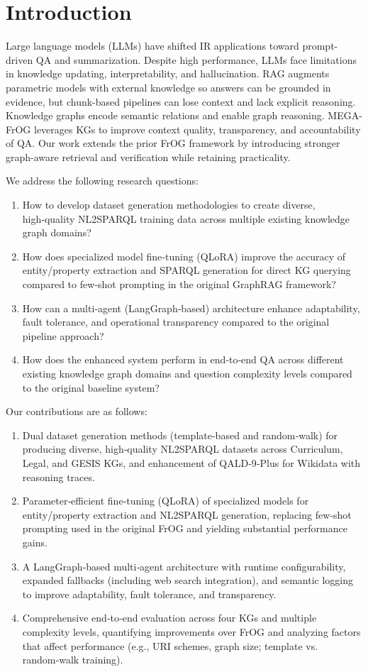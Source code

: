 \documentclass[12pt,a4paper,onecolumn]{article}
\begin{document}
\section*{Introduction}
Large language models (LLMs) have shifted IR applications toward prompt-driven QA and summarization. Despite high performance, LLMs face limitations in knowledge updating, interpretability, and hallucination. RAG augments parametric models with external knowledge so answers can be grounded in evidence, but chunk-based pipelines can lose context and lack explicit reasoning. Knowledge graphs encode semantic relations and enable graph reasoning. MEGA-FrOG leverages KGs to improve context quality, transparency, and accountability of QA. Our work extends the prior FrOG framework by introducing stronger graph-aware retrieval and verification while retaining practicality.

We address the following research questions:
\begin{enumerate}[leftmargin=*, label=RQ\arabic*:, itemsep=0.3\baselineskip]
  \item How to develop dataset generation methodologies to create diverse, high‑quality NL2SPARQL training data across multiple existing knowledge graph domains?
  \item How does specialized model fine‑tuning (QLoRA) improve the accuracy of entity/property extraction and SPARQL generation for direct KG querying compared to few‑shot prompting in the original GraphRAG framework?
  \item How can a multi‑agent (LangGraph‑based) architecture enhance adaptability, fault tolerance, and operational transparency compared to the original pipeline approach?
  \item How does the enhanced system perform in end‑to‑end QA across different existing knowledge graph domains and question complexity levels compared to the original baseline system?
\end{enumerate}

Our contributions are as follows:
\begin{enumerate}[leftmargin=*, label=C\arabic*), itemsep=0.3\baselineskip]
  \item Dual dataset generation methods (template‑based and random‑walk) for producing diverse, high‑quality NL2SPARQL datasets across Curriculum, Legal, and GESIS KGs, and enhancement of QALD‑9‑Plus for Wikidata with reasoning traces.
  \item Parameter‑efficient fine‑tuning (QLoRA) of specialized models for entity/property extraction and NL2SPARQL generation, replacing few‑shot prompting used in the original FrOG and yielding substantial performance gains.
  \item A LangGraph‑based multi‑agent architecture with runtime configurability, expanded fallbacks (including web search integration), and semantic logging to improve adaptability, fault tolerance, and transparency.
  \item Comprehensive end‑to‑end evaluation across four KGs and multiple complexity levels, quantifying improvements over FrOG and analyzing factors that affect performance (e.g., URI schemes, graph size; template vs. random‑walk training).
\end{enumerate}
\end{document}
